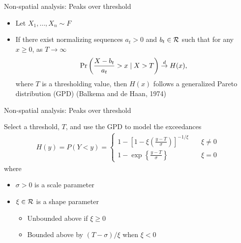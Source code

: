 \documentclass{beamer}
\begin{document}
\begin{frame}{Non-spatial analysis: Peaks over threshold}
  \begin{itemize} \setlength{\itemsep}{1em}
    \item Let $X_1, \ldots, X_n \sim F$
    \item If there exist normalizing sequences $a_t > 0$ and $b_t \in {\cal R}$ such that for any $x \ge 0$, as $T \rightarrow \infty$
    \begin{align*}
      \Pr\left(\frac{X - b_t}{a_t} > x \mid X > T\right) \stackrel{d}{\rightarrow} H(x),
    \end{align*}
    where $T$ is a thresholding value, then $H(x)$ follows a generalized Pareto distribution (GPD) (Balkema and de Haan, 1974)
  \end{itemize}
\end{frame}

\begin{frame}{Non-spatial analysis: Peaks over threshold}
\begin{adjustwidth}{1em}{0em}
  Select a threshold, $T$, and use the GPD to model the exceedances
  \begin{align*}
    H(y) = P(Y < y) = \left\{ \begin{array}{ll}
      1 - \left[1 - \xi \left( \frac{ y - T }{ \sigma } \right) \right]^{-1 / \xi} & \quad \xi \neq 0 \\[0.5em]
      1 - \exp \left\{ \frac{ y - T }{ \sigma} \right\} & \quad \xi = 0
    \end{array}\right.
  \end{align*}
  where
  \begin{itemize} \setlength{\itemsep}{0.25em}
    \item $\sigma > 0$ is a scale parameter
    \item $\xi \in {\cal R}$ is a shape parameter
    \begin{itemize}
      \item Unbounded above if $\xi \ge 0$
      \item Bounded above by $(T - \sigma) / \xi$ when $\xi < 0$
    \end{itemize}
  \end{itemize}
\end{adjustwidth}
\end{frame}
\end{document}
